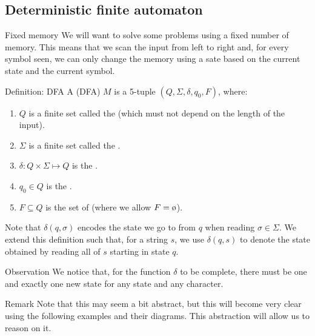 \documentclass[a4paper]{article}
\begin{document}
\subsection{Deterministic finite automaton}
\begin{parag}{Fixed memory}
    We will want to solve some problems using a fixed number of memory. This means that we scan the input from left to right and, for every symbol seen, we can only change the memory using a sate based on the current state and the current symbol.
\end{parag}

\begin{parag}{Definition: DFA}
    A  (DFA) $M$ is a 5-tuple $\left(Q, \Sigma, \delta, q_0, F\right)$, where:
    \begin{enumerate}
        \item $Q$ is a finite set called the  (which must not depend on the length of the input).
        \item $\Sigma$ is a finite set called the .
        \item $\delta: Q \times \Sigma \mapsto Q$ is the .
        \item $q_0 \in Q$ is the .
        \item $F \subseteq Q$ is the set of  (where we allow $F = \o$).
    \end{enumerate}

    Note that $\delta\left(q, \sigma\right)$ encodes the state we go to from $q$ when reading $\sigma \in \Sigma$. We extend this definition such that, for a string $s$, we use $\delta\left(q, s\right)$ to denote the state obtained by reading all of $s$ starting in state $q$.

    \begin{subparag}{Observation}
        We notice that, for the function $\delta$ to be complete, there must be one and exactly one new state for any state and any character.
    \end{subparag}
    
    \begin{subparag}{Remark}
        Note that this may seem a bit abstract, but this will become very clear using the following examples and their diagrams. This abstraction will allow us to reason on it.
    \end{subparag}
\end{parag}
\end{document}
